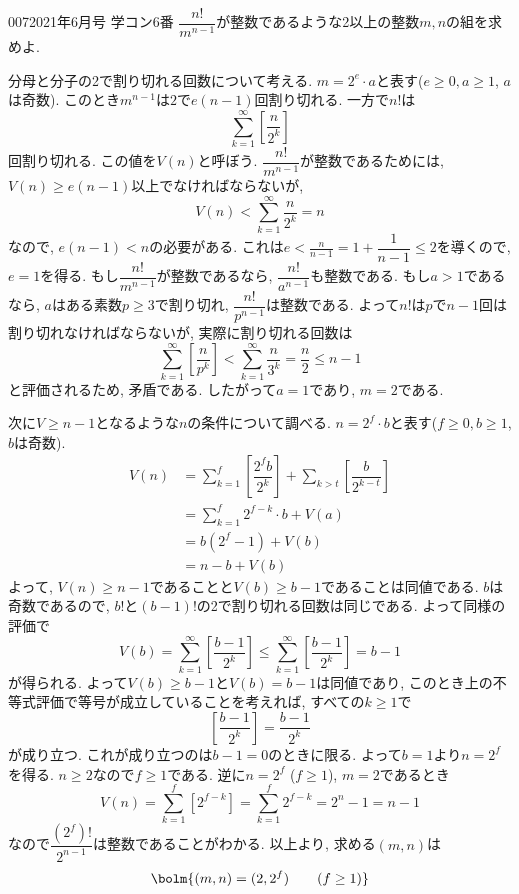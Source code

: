 \begin{prob}{007}{}{2021年6月号 学コン6番}
 $\dfrac{n!}{m^{n-1}}$が整数であるような2以上の整数$m,n$の組を求めよ.
\end{prob}

分母と分子の2で割り切れる回数について考える. $m=2^{e}\cdot a$と表す($e\geq 0, a\geq 1$, $a$は奇数). 
このとき$m^{n-1}$は$2$で$e(n-1)$回割り切れる. 一方で$n!$は
\[
\sum_{k=1}^{\infty} \left[ \dfrac{n}{2^k} \right]    
\] 
回割り切れる. この値を$V(n)$と呼ぼう. $\dfrac{n!}{m^{n-1}}$が整数であるためには, $V(n)\geq e(n-1)$以上でなければならないが, 
\[
    V(n) <  \sum_{k=1}^{\infty} \dfrac{n}{2^k} = n    
\]
なので, $e(n-1) < n$の必要がある. これは$e< \frac{n}{n-1} = 1 + \dfrac{1}{n-1} \leq 2$を導くので, $e=1$を得る. 
もし$\dfrac{n!}{m^{n-1}}$が整数であるなら, $\dfrac{n!}{a^{n-1}}$も整数である. もし$a>1$であるなら, $a$はある素数$p\geq 3$で割り切れ, $\dfrac{n!}{p^{n-1}}$は整数である. 
よって$n!$は$p$で$n-1$回は割り切れなければならないが, 実際に割り切れる回数は
\[
\sum_{k=1}^{\infty} \left[ \dfrac{n}{p^k}\right] < \sum_{k=1}^{\infty} \dfrac{n}{3^k} = \dfrac{n}{2} \leq n-1     
\]
と評価されるため, 矛盾である. したがって$a=1$であり, $m = 2$である. \par 
次に$V \geq n-1$となるような$n$の条件について調べる. $n=2^{f}\cdot b$と表す($f\geq 0, b\geq 1$, $b$は奇数). 
\begin{align*}
    V(n) &= \sum_{k=1}^{f} \left[ \dfrac{2^{f}b}{2^{k}} \right] + \sum_{k>t} \left[\dfrac{b}{2^{k-t}}\right] \\ 
      &= \sum_{k=1}^{f} 2^{f-k} \cdot b + V(a) \\ 
      &= b(2^{f} - 1) + V(b) \\ 
      &= n - b + V(b) 
\end{align*}
よって, $V(n) \geq n-1$であることと$V(b) \geq b-1$であることは同値である. $b$は奇数であるので, $b!$と$(b-1)!$の2で割り切れる回数は同じである. よって同様の評価で
\[
V(b) = \sum_{k=1}^{\infty} \left[ \dfrac{b-1}{2^{k}} \right] \leq \sum_{k=1}^{\infty} \left[\dfrac{b-1}{2^k} \right] = b-1   
\]
が得られる. よって$V(b) \geq b-1$と$V(b) = b-1$は同値であり, このとき上の不等式評価で等号が成立していることを考えれば, すべての$k\geq 1$で
\[
\left[\dfrac{b-1}{2^k}\right] = \dfrac{b-1}{2^k}    
\]
が成り立つ. これが成り立つのは$b-1=0$のときに限る. よって$b=1$より$n=2^{f}$を得る. $n\geq 2$なので$f\geq 1$である. 逆に$n=2^{f}$ ($f\geq 1$), $m=2$であるとき
\[V(n) = \sum_{k=1}^{f} [2^{f-k}] = \sum_{k=1}^{f} 2^{f-k} =  2^{n} - 1  = n-1\]
なので$\dfrac{(2^{f})!}{2^{n-1}}$は整数であることがわかる. 以上より, 求める$(m,n)$は
\[
\bolm{(m,n) = (2,2^{f})\qquad (f\geq 1)}
\]